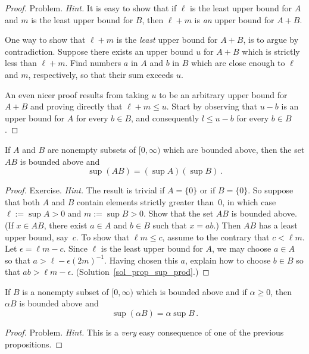 \begin{proof} Problem. \emph{Hint.}  It is easy to show that if $\ell$ is the least upper bound
for $A$ and $m$ is the least upper bound for $B$, then $\ell + m$ is \emph{an} upper bound for
$A + B$.

One way to show that $\ell + m$ is the \emph{least} upper bound for $A + B$, is to argue
by contradiction.  Suppose there exists an upper bound $u$ for $A + B$ which is strictly
less than $\ell + m$.  Find numbers $a$ in $A$ and $b$ in $B$ which are close enough to
$\ell$ and $m$, respectively, so that their sum exceeds $u$.

An even nicer proof results from taking $u$ to be an arbitrary upper bound for $A + B$
and proving directly that $\ell + m \le u$. Start by observing that $u - b$ is an upper
bound for $A$ for every $b \in B$, and consequently $l \le u - b$ for every $b \in B$.
\ns
\end{proof}

\begin{prop}\label{prop_sup_prod} If $A$ and $B$ are nonempty subsets of $[0,\infty)$ which are
bounded above, then the set $AB$ is bounded above and
  \[ \sup(AB) = (\sup A)(\sup B)\,. \]
\end{prop}

\begin{proof} Exercise.  \emph{Hint.}  The result is trivial if $A = \{0\}$ or if $B = \{0\}$.
So suppose that both $A$ and $B$ contain elements strictly greater than~$0$, in which case
$\ell := \sup A > 0$ and $m := \sup B > 0$.  Show that the set $AB$ is bounded above. (If $x
\in AB$, there exist $a \in A$ and $b \in B$ such that $x = ab$.)  Then $AB$ has a least upper
bound, say~$c$.  To show that $\ell m \le c$, assume to the contrary that $c < \ell m$. Let
$\epsilon = \ell m - c$. Since $\ell$ is the least upper bound for $A$, we may choose $a \in
A$ so that $a > \ell - \epsilon (2m)^{-1}$. Having chosen this $a$, explain how to choose $b
\in B$ so that $ab > \ell m - \epsilon$. (Solution~\ref{sol_prop_sup_prod}.)  \ns
\end{proof}

\begin{prop}  If $B$ is a nonempty subset of $[0,\infty)$ which is bounded above and if
$\alpha \ge 0$, then $\alpha B$ is bounded above and
  \[ \sup (\alpha B) = \alpha \sup B\,. \]
\end{prop}

\begin{proof} Problem.  \emph{Hint.}  This is a \emph{very} easy consequence of one of the
previous propositions.
\end{proof}






